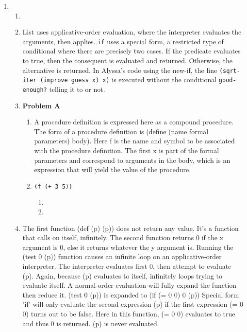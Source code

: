 \documentclass[a4paper,12pt]{article}
\begin{document}
\begin{enumerate}
	\item
	\begin{enumerate}
		\item 
		\item List uses applicative-order evaluation, where the interpreter evaluates the arguments, then applies. \texttt{if} uses a special form, a restricted type of conditional where there are precisely two cases. If the predicate evaluates to true, then the consequent is evaluated and returned. Otherwise, the alternative is returned. In Alyssa's code using the new-if, the line \texttt{(sqrt-iter (improve guess x) x)} is executed without the conditional \texttt{good-enough?} telling it to or not.
		\item {\bf Problem A}
		\begin{enumerate}
			\item A procedure definition is expressed here as a compound procedure. The form of a procedure definition is (define (name formal parameters) body). Here f is the name and symbol to be associated with the procedure definition. The first x is part of the formal parameters and correspond to arguments in the body, which is an expression that will yield the value of the procedure.
			
			\item \texttt{(f (+ 3 5))}
			\begin{enumerate}
				\item 
				
				\item 
			\end{enumerate}
			
		\end{enumerate}
		
		\item The first function (def (p) (p)) does not return any value. It's a function that calls on itself, infinitely. The second function returns 0 if the x argument is 0, else it returns whatever the y argument is. Running the (test 0 (p)) function causes an infinite loop on an applicative-order interpreter. The interpreter evaluates first 0, then attempt to evaluate (p). Again, because (p) evaluates to itself, infinitely loops trying to evaluate itself. A normal-order evaluation will fully expand the function then reduce it. (test 0 (p)) is expanded to (if (= 0 0) 0 (p))
		Special form 'if' will only evaluate the second expression (p) if the first expression (= 0 0) turns out to be false. Here in this function, (= 0 0) evaluates to true and thus 0 is returned. (p) is never evaluated.
		

\end{enumerate}
\end{enumerate}
\end{document}
